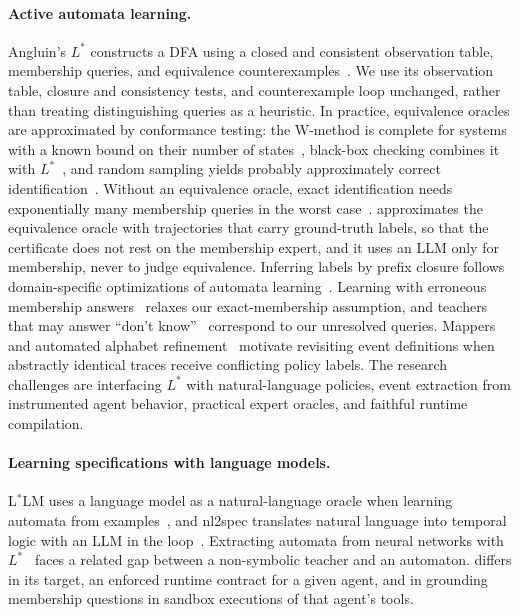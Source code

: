 \paragraph{Active automata learning.}
Angluin's $L^*$ constructs a DFA using a closed and consistent observation table, membership queries, and equivalence counterexamples~\cite{angluin1987learning}. We use its observation table, closure and consistency tests, and counterexample loop unchanged, rather than treating distinguishing queries as a heuristic. In practice, equivalence oracles are approximated by conformance testing: the W-method is complete for systems with a known bound on their number of states~\cite{chow1978testing,vasilevskii1973failure}, black-box checking combines it with $L^*$~\cite{peled1999blackbox}, and random sampling yields probably approximately correct identification~\cite{angluin1988queries}. Without an equivalence oracle, exact identification needs exponentially many membership queries in the worst case~\cite{angluin1981note}. \system approximates the equivalence oracle with trajectories that carry ground-truth labels, so that the certificate does not rest on the membership expert, and it uses an LLM only for membership, never to judge equivalence. Inferring labels by prefix closure follows domain-specific optimizations of automata learning~\cite{hungar2003domain}. Learning with erroneous membership answers~\cite{sakakibara1991noise,angluin1997malicious} relaxes our exact-membership assumption, and teachers that may answer ``don't know''~\cite{grinchtein2006learning} correspond to our unresolved queries. Mappers~\cite{aarts2015mappers} and automated alphabet refinement~\cite{howar2011alphabet} motivate revisiting event definitions when abstractly identical traces receive conflicting policy labels. The research challenges are interfacing $L^*$ with natural-language policies, event extraction from instrumented agent behavior, practical expert oracles, and faithful runtime compilation.

\paragraph{Learning specifications with language models.}
L$^*$LM uses a language model as a natural-language oracle when learning automata from examples~\cite{vazquez2024lstarlm}, and nl2spec translates natural language into temporal logic with an LLM in the loop~\cite{cosler2023nl2spec}. Extracting automata from neural networks with $L^*$~\cite{weiss2018extracting} faces a related gap between a non-symbolic teacher and an automaton. \system differs in its target, an enforced runtime contract for a given agent, and in grounding membership questions in sandbox executions of that agent's tools.

